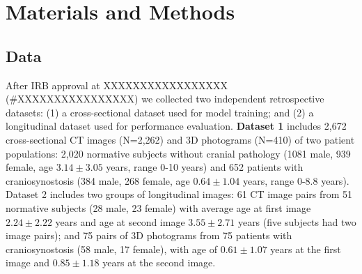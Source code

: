 \documentclass[conference]{IEEEtran}
\begin{document}
\section{Materials and Methods}
\subsection{Data}
After IRB approval at XXXXXXXXXXXXXXXXX (\#XXXXXXXXXXXXXXXX) we collected two independent retrospective datasets: (1) a cross-sectional dataset used for model training; and (2) a longitudinal dataset used for performance evaluation. \textbf{Dataset 1} includes 2,672 cross-sectional CT images (N=2,262) and 3D photograms (N=410) of two patient populations: 2,020 normative subjects without cranial pathology (1081 male, 939 female, age $3.14 \pm 3.05$ years, range 0-10 years) and 652 patients with craniosynostosis (384 male, 268 female, age $0.64 \pm 1.04$ years, range 0-8.8 years). Dataset 2 includes two groups of longitudinal images: 61 CT image pairs from 51 normative subjects (28 male, 23 female) with average age at first image $2.24 \pm 2.22$ years and age at second image $3.55 \pm 2.71$ years (five subjects had two image pairs); and 75 pairs of 3D photograms from 75 patients with craniosynostosis (58 male, 17 female), with age of $0.61 \pm 1.07$ years at the first image and $0.85 \pm 1.18$ years at the second image.


\end{document}
